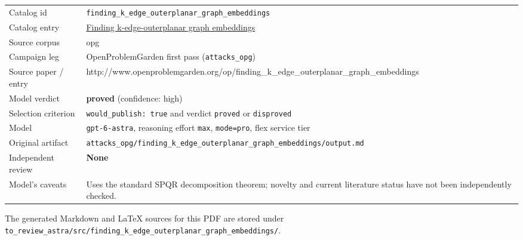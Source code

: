 \documentclass[
  11pt,
  a4paper,
]{article}
\newcounter{none} %
\begin{document}
{\def\LTcaptype{none} %
\begin{longtable}[]{@{}
  >{\raggedright\arraybackslash}p{}
  >{\raggedright\arraybackslash}p{}@{}}
\toprule\noalign{}
\endhead
\bottomrule\noalign{}
\endlastfoot
Catalog id &
\texttt{finding\_k\_edge\_outerplanar\_graph\_embeddings} \\
Catalog entry &
\href{https://graph-theory-ai.github.io/graph-conjectures/op/finding_k_edge_outerplanar_graph_embeddings/}{Finding
k-edge-outerplanar graph embeddings} \\
Source corpus & opg \\
Campaign leg & OpenProblemGarden first pass (\texttt{attacks\_opg}) \\
Source paper / entry &
http://www.openproblemgarden.org/op/finding\_k\_edge\_outerplanar\_graph\_embeddings \\
Model verdict & \textbf{proved} (confidence: high) \\
Selection criterion & \texttt{would\_publish:\ true} and verdict
\texttt{proved} or \texttt{disproved} \\
Model & \texttt{gpt-6-astra}, reasoning effort \texttt{max},
\texttt{mode=pro}, flex service tier \\
Original artifact &
\texttt{attacks\_opg/finding\_k\_edge\_outerplanar\_graph\_embeddings/output.md} \\
Independent review & \textbf{None} \\
Model's caveats & Uses the standard SPQR decomposition theorem; novelty
and current literature status have not been independently checked. \\
\end{longtable}
}

The generated Markdown and LaTeX sources for this PDF are stored under
\texttt{to\_review\_astra/src/finding\_k\_edge\_outerplanar\_graph\_embeddings/}.
\end{document}
